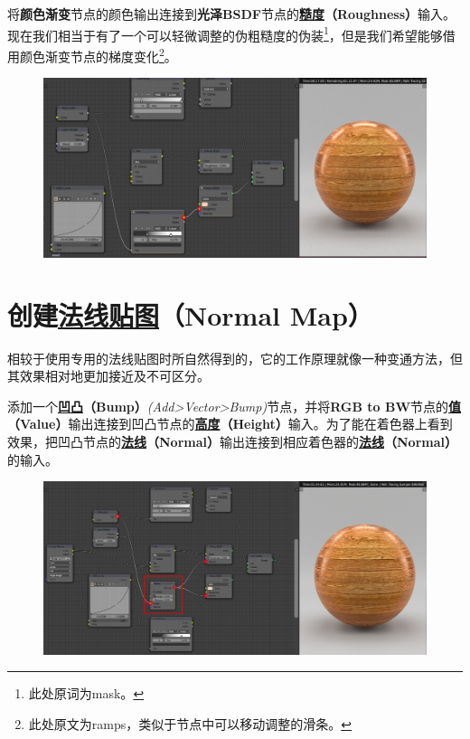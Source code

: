 \documentclass[11pt,a4paper,UTF8]{ctexart}
\begin{document}
\newpage
将\textbf{颜色渐变}节点的颜色输出连接到\textbf{光泽BSDF}节点的\textbf{\underline{糙度}（Roughness）}输入。现在我们相当于有了一个可以轻微调整的伪粗糙度的伪装\footnote{此处原词为mask。}，但是我们希望能够借用颜色渐变节点的梯度变化\footnote{此处原文为ramps，类似于节点中可以移动调整的滑条。}。

\begin{figure}[hb]
    \centering
    \includegraphics[scale=0.41]{step5_2.png}
\end{figure}

\section{创建\underline{法线贴图}（Normal Map）}
相较于使用专用的法线贴图时所自然得到的，它的工作原理就像一种变通方法，但其效果相对地更加接近及不可区分。

添加一个\textbf{\underline{凹凸}（Bump）}\emph{(Add>Vector>Bump)}节点，并将\textbf{RGB to BW}节点的\textbf{\underline{值}（Value）}输出连接到凹凸节点的\textbf{\underline{高度}（Height）}输入。为了能在着色器上看到效果，把凹凸节点的\textbf{\underline{法线}（Normal）}输出连接到相应着色器的\textbf{\underline{法线}（Normal）}的输入。

\begin{figure}[hb]
    \centering
    \includegraphics[scale=0.41]{step6.png}
\end{figure}
\end{document}
